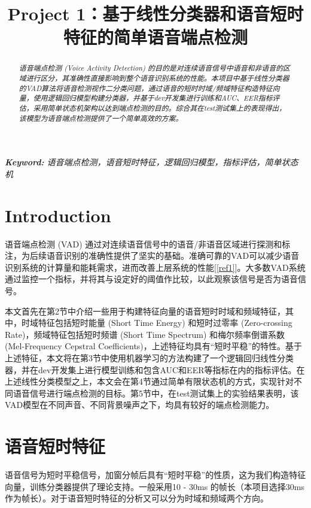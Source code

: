 \documentclass[a4paper]{article}
\title{Project 1：基于线性分类器和语音短时特征的简单语音端点检测}
\begin{document}
\maketitle

\begin{abstract}
    \textit{语音端点检测 (Voice Activity Detection) 的目的是对连续语音信号中语音和非语音的区域进行区分，其准确性直接影响到整个语音识别系统的性能。本项目中基于线性分类器的VAD算法将语音检测视作二分类问题，通过语音的短时时域/频域特征构造特征向量，使用逻辑回归模型构建分类器，并基于dev开发集进行训练和AUC、EER指标评估，采用简单状态机架构以达到端点检测的目的。综合其在test测试集上的表现得出，该模型为语音端点检测提供了一个简单高效的方案。} 
\end{abstract}

\textit{
\textbf{Keyword:} 语音端点检测，语音短时特征，逻辑回归模型，指标评估，简单状态机
}


\section{Introduction}

语音端点检测 (VAD) 通过对连续语音信号中的语音/非语音区域进行探测和标注，为后续语音识别的准确性提供了坚实的基础。准确可靠的VAD可以减少语音识别系统的计算量和能耗需求，进而改善上层系统的性能[\ref{ref1}]。大多数VAD系统通过监控一个指标，并将其与设定好的阈值作比较，以此观察该信号是否为语音信号。

本文首先在第2节中介绍一些用于构建特征向量的语音短时时域和频域特征，其中，时域特征包括短时能量 (Short Time Energy) 和短时过零率 (Zero-crossing Rate)，频域特征包括短时频谱 (Short Time Spectrum) 和梅尔频率倒谱系数 (Mel-Frequency Cepstral Coefficients)，上述特征均具有“短时平稳”的特性。基于上述特征，本文将在第3节中使用机器学习的方法构建了一个逻辑回归线性分类器，并在dev开发集上进行模型训练和包含AUC和EER等指标在内的指标评估。在上述线性分类模型之上，本文会在第4节通过简单有限状态机的方式，实现针对不同语音信号进行端点检测的目标。第5节中，在test测试集上的实验结果表明，该VAD模型在不同声音、不同背景噪声之下，均具有较好的端点检测能力。

\section{语音短时特征}

语音信号为短时平稳信号，加窗分帧后具有“短时平稳”的性质，这为我们构造特征向量，训练分类器提供了理论支持。一般采用10 - 30ms 的帧长（本项目选择30ms 作为帧长）。对于语音短时特征的分析又可以分为时域和频域两个方向。
\end{document}
